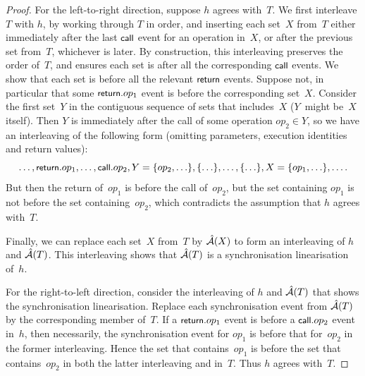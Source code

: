 \begin{proof}
For the left-to-right direction, suppose $h$ agrees with~$T$.  We first
interleave $T$ with $h$, by working through $T$ in order, and inserting each
set~$X$ from~$T$ either immediately after the last $\mbox{\sf{\small call}}$ event for an
operation in~$X$, or after the previous set from~$T$, whichever is later.  By
construction, this interleaving preserves the order of~$T$, and ensures each
set is after all the corresponding $\mbox{\sf{\small call}}$ events.  We show that each set is
before all the relevant $\mbox{\sf{\small return}}$ events.  Suppose not, in particular that
some $\mbox{\sf{\small return}}.op_1$ event is before the corresponding set~$X$.  Consider the
first set~$Y$ in the contiguous sequence of sets that includes~$X$ ($Y$~might
be~$X$ itself).  Then $Y$ is immediately after the call of some operation
$op_2 \in Y$, so we have an interleaving of the following form (omitting
parameters, execution identities and return values):
\[
\ldots, \mbox{\sf{\small return}}.op_1, \ldots, \mbox{\sf{\small call}}.op_2, Y = \{ op_2,\ldots \}, \{ \ldots \},
  \ldots, \{ \ldots \},
  X = \{ op_1,\ldots \}, \ldots .
\] 
But then the return of~$op_1$ is before the call of~$op_2$, but the set
containing $op_1$ is not before the set containing~$op_2$, which contradicts
the assumption that $h$ agrees with~$T$. 
  
Finally, we can replace each set~$X$ from~$T$ by $\hat{\mathcal{A}}(X)$ to form an
interleaving of $h$ and $\hat{\mathcal{A}}(T)$.  This interleaving shows that
$\hat{\mathcal{A}}(T)$ is a synchronisation linearisation of~$h$.

For the right-to-left direction, consider the interleaving of $h$ and
$\hat{\mathcal{A}}(T)$ that shows the synchronisation linearisation.  Replace each
synchronisation event from $\hat{\mathcal{A}}(T)$ by the corresponding member of~$T$.  If
a $\mbox{\sf{\small return}}.op_1$ event is before a $\mbox{\sf{\small call}}.op_2$ event in~$h$, then
necessarily, the synchronisation event for $op_1$ is before that for~$op_2$ in
the former interleaving.  Hence the set that contains~$op_1$ is before the set
that contains~$op_2$ in both the latter interleaving and in~$T$.  Thus $h$
agrees with~$T$.
\end{proof}


